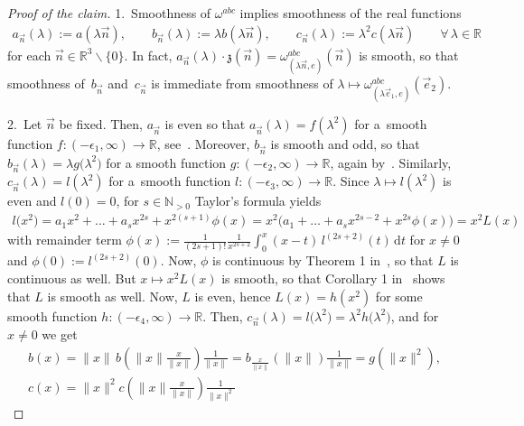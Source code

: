 \documentclass[pdftex]{sigma}
\numberwithin{equation}{section}
\begin{document}
\begin{Example}
\begin{proof}[Proof of the claim]
1.~Smoothness of $\omega^{abc}$ implies smoothness of the real functions
\begin{gather*}
a_{\vec{n}}(\lambda):= a(\lambda\vec{n}),
\qquad
b_{\vec{n}}(\lambda):=\lambda b(\lambda\vec{n}),
\qquad
c_{\vec{n}}(\lambda):= \lambda^2 c(\lambda\vec{n})
\qquad\forall\, \lambda\in \mathbb{R}
\end{gather*}
for each $\vec{n}\in\mathbb{R}^3\backslash\{0\}$.
In fact, $a_{\vec{n}}(\lambda)\cdot {\mathfrak{z}}(\vec{n})=\omega^{abc}_{(\lambda \vec{n},e)}(\vec{n})$ is smooth, so that
smoothness of~$b_{\vec{n}}$ and~$c_{\vec{n}}$ is immediate from smoothness of $\lambda \mapsto \omega^{abc}_{(\lambda
\vec{e}_1,e)}(\vec{e}_2)$.

2.~Let $\vec{n}$ be f\/ixed.
Then, $a_{\vec{n}}$ is even so that $a_{\vec{n}}(\lambda){=}f (\lambda^2 )$ for a~smooth function $f\colon\!
(-\epsilon_1,\infty){\rightarrow} \mathbb{R}$, see~\cite{HasslerWhitneyb}.
Moreover, $b_{\vec{n}}$ is smooth and odd, so that $b_{\vec{n}}(\lambda) =\lambda g\big(\lambda^2\big)$ for a smooth
function $g\colon (-\epsilon_2,\infty)\rightarrow \mathbb{R}$, again by~\cite{HasslerWhitneyb}.
Similarly, $c_{\vec{n}}(\lambda)= l(\lambda^2)$ for a~smooth function $l\colon (-\epsilon_3,\infty)\rightarrow
\mathbb{R}$.
Since $\lambda \mapsto l(\lambda^2)$ is even and $l(0)=0$, for $s\in \mathbb{N}_{>0}$ Taylor's formula yields
\begin{gather*}
l\big(x^2\big)= a_1 x^2 +\dots + a_{s}x^{2s} + x^{2(s+1)}\phi(x)
=x^2 \big(a_1 +\dots + a_{s}x^{2s-2} + x^{2s}\phi(x)\big)=x^2L(x)
\end{gather*}
with remainder term $\phi(x):=\frac{1}{(2s+1)!}\frac{1}{x^{2s+2}}\int_{0}^{x}(x-t)\,l^{(2s+2)}(t)\,
\mathrm{d} t$ for $x\neq 0$ and $\phi(0):=l^{(2s+2)}(0)$.
Now, $\phi$ is continuous by Theorem 1 in~\cite{HasslerWhitneya}, so that $L$ is continuous as well.
But $x\mapsto x^2 L(x)$ is smooth, so that Corollary 1 in~\cite{HasslerWhitneya} shows that $L$ is smooth as well.
Now, $L$ is even, hence $L(x)=h(x^2)$ for some smooth function $h\colon (-\epsilon_4,\infty )\rightarrow \mathbb{R}$.
Then, $c_{\vec{n}}(\lambda)=l\big(\lambda^2\big)=\lambda^2h\big(\lambda^2\big)$, and for $x\neq 0$ we get
\begin{gather*}
b(x)=\|x\|\,b\left(\|x\|\frac{x}{\|x\|}\right)\frac{1}{\|x\|}= b_{\textstyle{\frac{x}{\|x\|}}}(\|x\|)\frac{1}{\|x\|}
=g\left(\|x\|^2\right),
\\
c(x)=\|x\|^2c\left(\|x\|\frac{x}{\|x\|}\right)\frac{1}{\|x\|^2}

\end{gather*}
\end{proof}
\end{Example}
\end{document}
